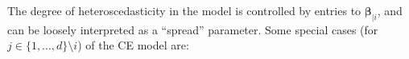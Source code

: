 \documentclass[
  12pt]{article}
\DeclareMathOperator{\CE}{\mathrm{CE}}
\begin{document}
The degree of heteroscedasticity in the model is controlled by entries to $\symbf{\beta}_{\mid i}$, and can be loosely interpreted as a ``spread'' parameter.
Some special cases (for $j\in\{1,\ldots,d\}\setminus i$) of the CE model are:
\end{document}
